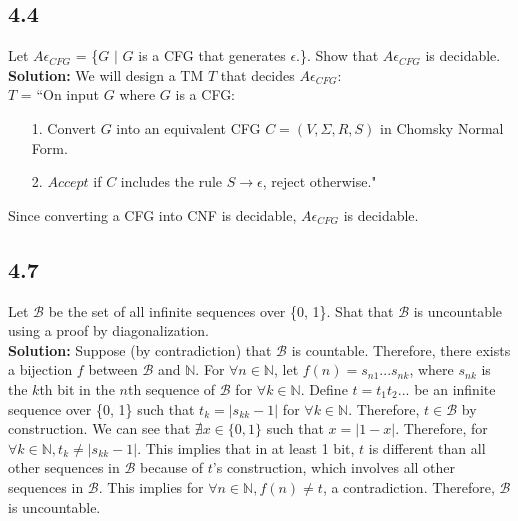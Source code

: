 \subsection*{4.4} Let $A\epsilon_{CFG}$ = \{\textlangle{}$G$\textrangle{} $|$ $G$ is a CFG that generates $\epsilon$.\}. Show that $A\epsilon_{CFG}$ is decidable.
\\
\textbf{Solution:} We will design a TM $T$ that decides $A\epsilon_{CFG}$:
\\
$T$ = ``On input \textlangle{}$G$\textrangle{} where $G$ is a CFG:
\begin{enumerate}
\itemsep0em
\item[1.]Convert $G$ into an equivalent CFG $C = (V, \Sigma, R, S)$ in Chomsky Normal Form.
\item[2.]$Accept$ if $C$ includes the rule $S \rightarrow \epsilon$, reject otherwise."
\end{enumerate}
Since converting a CFG into CNF is decidable, $A\epsilon_{CFG}$ is decidable.

\subsection*{4.7} Let $\mathcal{B}$ be the set of all infinite sequences over \{0, 1\}. Shat that $\mathcal{B}$ is uncountable using a proof by diagonalization.
\\
\textbf{Solution:} Suppose (by contradiction) that $\mathcal{B}$ is countable. Therefore, there exists a bijection $f$ between $\mathcal{B}$ and $\mathbb{N}$. For $\forall n \in \mathbb{N}$, let $f(n) = s_{n1}...s_{nk}$, where $s_{nk}$ is the $k$th bit in the $n$th sequence of $\mathcal{B}$ for $\forall{k} \in \mathbb{N}$. Define $t = t_1t_2...$ be an infinite sequence over \{0, 1\} such that $t_k = |s_{kk}-1|$ for $\forall k \in \mathbb{N}$. Therefore, $t \in \mathcal{B}$ by construction. We can see that $\nexists x \in \{0, 1\}$ such that $x = |1-x|$. Therefore, for $\forall k \in \mathbb{N}, t_k \ne |s_{kk} - 1|$. This implies that in at least 1 bit, $t$ is different than all other sequences in $\mathcal{B}$ because of $t$'s construction, which involves all other sequences in $\mathcal{B}$. This implies for $\forall n \in \mathbb{N}, f(n) \ne t$, a contradiction. Therefore, $\mathcal{B}$ is uncountable.

